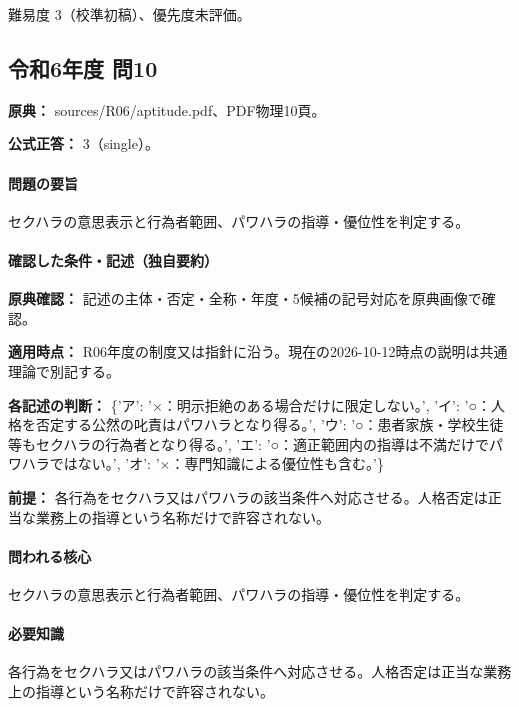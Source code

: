 \par 難易度 3（校準初稿）、優先度未評価。

\subsection{令和6年度 問10}
\label{q:r06-reg-apt-10}

\noindent\textbf{原典：} sources/R06/aptitude.pdf、PDF物理10頁。

\textbf{公式正答：} 3（single）。

\paragraph{問題の要旨} セクハラの意思表示と行為者範囲、パワハラの指導・優位性を判定する。

\paragraph{確認した条件・記述（独自要約）}\mbox{}\par

\noindent\textbf{原典確認：} 記述の主体・否定・全称・年度・5候補の記号対応を原典画像で確認。\par

\noindent\textbf{適用時点：} R06年度の制度又は指針に沿う。現在の2026-10-12時点の説明は共通理論で別記する。\par

\noindent\textbf{各記述の判断：} \{'ア': '×：明示拒絶のある場合だけに限定しない。', 'イ': '○：人格を否定する公然の叱責はパワハラとなり得る。', 'ウ': '○：患者家族・学校生徒等もセクハラの行為者となり得る。', 'エ': '○：適正範囲内の指導は不満だけでパワハラではない。', 'オ': '×：専門知識による優位性も含む。'\}\par

\noindent\textbf{前提：} 各行為をセクハラ又はパワハラの該当条件へ対応させる。人格否定は正当な業務上の指導という名称だけで許容されない。\par

\paragraph{問われる核心} セクハラの意思表示と行為者範囲、パワハラの指導・優位性を判定する。

\paragraph{必要知識} 各行為をセクハラ又はパワハラの該当条件へ対応させる。人格否定は正当な業務上の指導という名称だけで許容されない。

